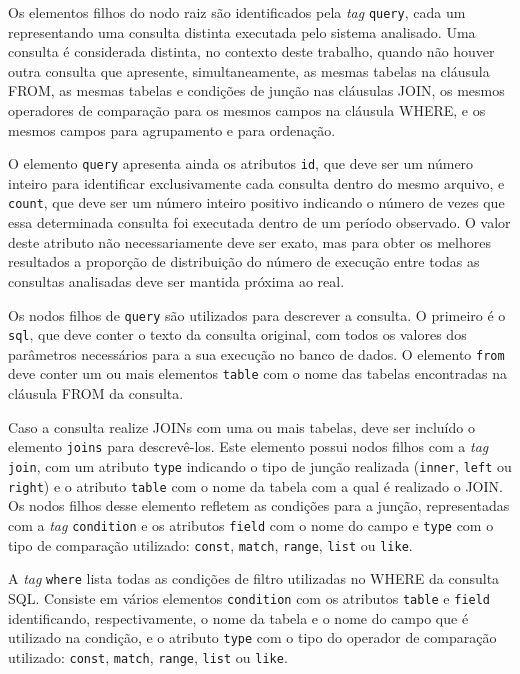 Os elementos filhos do nodo raiz são identificados pela \textit{tag} \texttt{query}, cada um representando uma consulta distinta executada pelo sistema analisado. Uma consulta é considerada distinta, no contexto deste trabalho, quando não houver outra consulta que apresente, simultaneamente, as mesmas tabelas na cláusula FROM, as mesmas tabelas e condições de junção nas cláusulas JOIN, os mesmos operadores de comparação para os mesmos campos na cláusula WHERE, e os mesmos campos para agrupamento e para ordenação.

O elemento \texttt{query} apresenta ainda os atributos \texttt{id}, que deve ser um número inteiro para identificar exclusivamente cada consulta dentro do mesmo arquivo, e \texttt{count}, que deve ser um número inteiro positivo indicando o número de vezes que essa determinada consulta foi executada dentro de um período observado. O valor deste atributo não necessariamente deve ser exato, mas para obter os melhores resultados a proporção de distribuição do número de execução entre todas as consultas analisadas deve ser mantida próxima ao real.

Os nodos filhos de \texttt{query} são utilizados para descrever a consulta. O primeiro é o \texttt{sql}, que deve conter o texto da consulta original, com todos os valores dos parâmetros necessários para a sua execução no banco de dados. O elemento \texttt{from} deve conter um ou mais elementos \texttt{table} com o nome das tabelas encontradas na cláusula FROM da consulta.

Caso a consulta realize JOINs com uma ou mais tabelas, deve ser incluído o elemento \texttt{joins} para descrevê-los. Este elemento possui nodos filhos com a \textit{tag} \texttt{join}, com um atributo \texttt{type} indicando o tipo de junção realizada (\texttt{inner}, \texttt{left} ou \texttt{right}) e o atributo \texttt{table} com o nome da tabela com a qual é realizado o JOIN. Os nodos filhos desse elemento refletem as condições para a junção, representadas com a \textit{tag} \texttt{condition} e os atributos \texttt{field} com o nome do campo e \texttt{type} com o tipo de comparação utilizado: \texttt{const}, \texttt{match}, \texttt{range}, \texttt{list} ou \texttt{like}.

A \textit{tag} \texttt{where} lista todas as condições de filtro utilizadas no WHERE da consulta SQL. Consiste em vários elementos \texttt{condition} com os atributos \texttt{table} e \texttt{field} identificando, respectivamente, o nome da tabela e o nome do campo que é utilizado na condição, e o atributo \texttt{type} com o tipo do operador de comparação utilizado: \texttt{const}, \texttt{match}, \texttt{range}, \texttt{list} ou \texttt{like}.

